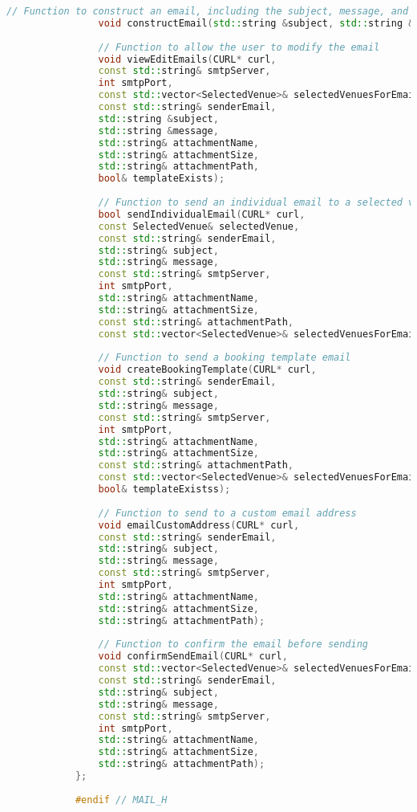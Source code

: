 \documentclass{article}
\begin{document}
\begin{mdframed}[backgroundcolor=background, hidealllines=false, innerleftmargin=15pt, innerrightmargin=5pt, innertopmargin=0pt, innerbottommargin=-5pt]
\begin{lstlisting}[language=C++]
				// Function to construct an email, including the subject, message, and attachment details
				void constructEmail(std::string &subject, std::string &message, std::string &attachmentPath, std::string &attachmentName, std::string &attachmentSize, std::istream &in = std::cin);
				
				// Function to allow the user to modify the email
				void viewEditEmails(CURL* curl, 
				const std::string& smtpServer,
				int smtpPort,
				const std::vector<SelectedVenue>& selectedVenuesForEmail,
				const std::string& senderEmail, 
				std::string &subject, 
				std::string &message, 
				std::string& attachmentName, 
				std::string& attachmentSize, 
				std::string& attachmentPath, 
				bool& templateExists);
				
				// Function to send an individual email to a selected venue
				bool sendIndividualEmail(CURL* curl,
				const SelectedVenue& selectedVenue,
				const std::string& senderEmail,
				std::string& subject,
				std::string& message,
				const std::string& smtpServer,
				int smtpPort,
				std::string& attachmentName,
				std::string& attachmentSize,
				const std::string& attachmentPath,
				const std::vector<SelectedVenue>& selectedVenuesForEmail);
				
				// Function to send a booking template email
				void createBookingTemplate(CURL* curl,
				const std::string& senderEmail,
				std::string& subject,
				std::string& message,
				const std::string& smtpServer,
				int smtpPort,
				std::string& attachmentName,
				std::string& attachmentSize,
				const std::string& attachmentPath,
				const std::vector<SelectedVenue>& selectedVenuesForEmail,
				bool& templateExistss);
				
				// Function to send to a custom email address
				void emailCustomAddress(CURL* curl,
				const std::string& senderEmail,
				std::string& subject,
				std::string& message,
				const std::string& smtpServer,
				int smtpPort,
				std::string& attachmentName,
				std::string& attachmentSize,
				std::string& attachmentPath);
				
				// Function to confirm the email before sending
				void confirmSendEmail(CURL* curl,
				const std::vector<SelectedVenue>& selectedVenuesForEmail,
				const std::string& senderEmail,
				std::string& subject,
				std::string& message,
				const std::string& smtpServer,
				int smtpPort,
				std::string& attachmentName,
				std::string& attachmentSize,
				std::string& attachmentPath);
			};
			
			#endif // MAIL_H
			
		\end{lstlisting}
	\end{mdframed}
	
\end{document}
